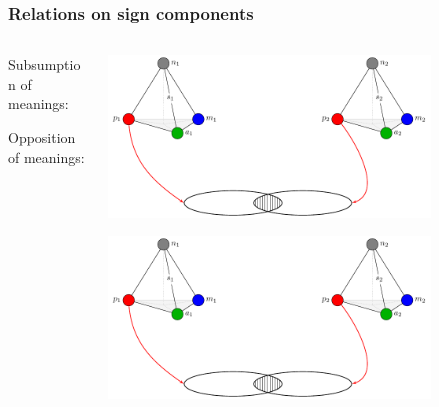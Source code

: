 \documentclass[default]{beamer}
\begin{document}
	\begin{frame}
		\frametitle{Relations on sign components}
		
		\begin{columns}
			\begin{column}{0.3\textwidth}
				\centering
				Subsumption of meanings: 
				\par\bigskip
				\par\bigskip
				\par\bigskip
				\par\bigskip
				\par\bigskip
				Opposition of meanings: 
				
			\end{column}
			\begin{column}{0.7\textwidth}
				\includegraphics[page=5,width=0.8\textwidth]{signs/sign_relations}
				\par\bigskip
				\includegraphics[page=6,width=0.8\textwidth]{signs/sign_relations}
			\end{column}
		\end{columns}
		
	\end{frame}	
\end{document}
